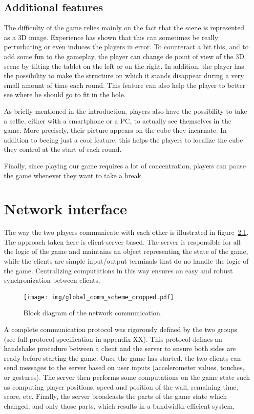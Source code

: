 \documentclass[english, DIV=13]{scrreprt}
\begin{document}
\section{Additional features}
The difficulty of the game relies mainly on the fact that the scene is represented as a
3D image. Experience has shown that this can sometimes be really perturbating or even
induces the players in error. To counteract a bit this, and to add some fun to the
gameplay, the player can change de point of view of the 3D scene by tilting the tablet
on the left or on the right. In addition, the player has the possibility to make the
structure on which it stands disappear during a very small amount of time each round.
This feature can also help the player to better see where he should go to fit in the hole.

As briefly mentioned in the introduction, players also have the possibility to take a
selfie, either with a smartphone or a PC, to actually see themselves in the game. More
precisely, their picture appears on the cube they incarnate. In addition to beeing just a
cool feature, this helps the players to localize the cube they control at the start of
each round.

Finally, since playing our game requires a lot of concentration, players can pause the
game whenever they want to take a break.

\chapter{Network interface}
\label{chap:net-interface}

The way the two players communicate with each other is illustrated in
figure~\ref{fig:comm-scheme}.
The approach taken here is client-server based. The server is responsible
for all the logic of the game and maintains an object representing the state of the game,
while the clients are simple input/output terminals that do no handle the logic of the
game. Centralizing computations in this way ensures an easy and robust synchronization
between clients.

\begin{figure}[hbt]
    \centering
    \texttt{[image: img/global\_comm\_scheme\_cropped.pdf]}
    \caption{Block diagram of the network communication.}
    \label{fig:comm-scheme}
\end{figure}

A complete communication protocol was rigorously defined by the two groups (see full
protocol specification in appendix XX).
This protocol defines an handshake procedure between a client and the server to ensure both
sides are ready before starting the game.
Once the game has started, the two clients can send
messages to the server based on user inputs (accelerometer values, touches, or gestures).
The server then performs some computations on the game state such as computing player
positions, speed and position of the wall, remaining time, score, etc. Finally, the server
broadcasts the parts of the game state which changed, and only those parts, which results
in a bandwidth-efficient system.
\end{document}
